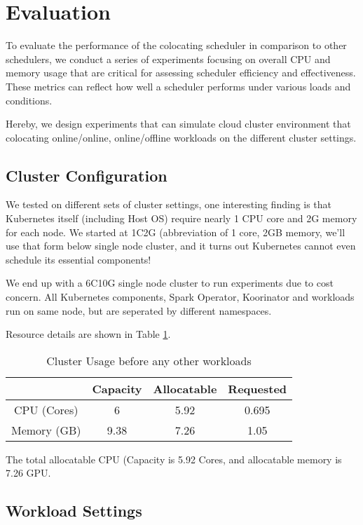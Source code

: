 \section{Evaluation}

To evaluate the performance of the colocating scheduler in comparison to other schedulers, we conduct a series of experiments focusing on overall CPU and memory usage that are critical for assessing scheduler efficiency and effectiveness. These metrics can reflect how well a scheduler performs under various loads and conditions.

Hereby, we design experiments that can simulate cloud cluster environment that colocating online/online, online/offline workloads on the different cluster settings.

\subsection{Cluster Configuration}

We tested on different sets of cluster settings, one interesting finding is that Kubernetes itself (including Host OS) require nearly 1 CPU core and 2G memory for each node. We started at 1C2G (abbreviation of 1 core, 2GB memory, we'll use that form below single node cluster, and it turns out Kubernetes cannot even schedule its essential components!

We end up with a 6C10G single node cluster to run experiments due to cost concern. All Kubernetes components, Spark Operator, Koorinator and workloads run on same node, but are seperated by different namespaces.

Resource details are shown in Table \ref{tab:initial}.

\begin{table}
	\centering
	\begin{tabular}{c|ccc}
		            & Capacity & Allocatable & Requested \\
		\hline
		CPU (Cores) & 6        & 5.92        & 0.695     \\
		Memory (GB) & 9.38     & 7.26        & 1.05      \\
	\end{tabular}
	\caption{Cluster Usage before any other workloads}
	\label{tab:initial}
\end{table}
The total allocatable CPU (Capacity  is 5.92 Cores, and allocatable memory is 7.26 GPU.

\subsection{Workload Settings}

